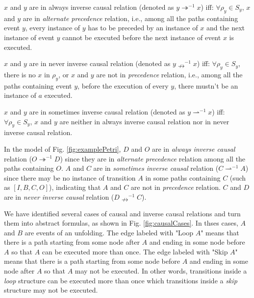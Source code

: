 \documentclass{llncs}
\begin{document}
\begin{definition}\label{def:alwaysInverseCausal}
$x$ and $y$ are in always inverse causal relation (denoted as $y\twoheadrightarrow^{-1}x$) iff: $\forall\rho_{y}\in S_{y}$, $x$ and $y$ are in \textit{alternate precedence} relation, i.e., among all the paths containing event $y$, every instance of $y$ has to be preceded by an instance of $x$ and the next instance of event $y$ cannot be executed before the next instance of event $x$ is executed.
\end{definition}

\begin{definition}\label{def:neverInverseCausal}
$x$ and $y$ are in never inverse causal relation (denoted as $y\nrightarrow^{-1}x$) iff: $\forall\rho_{y}\in S_{y}$, there is no $x$ in $\rho_{y}$, or $x$ and $y$ are not in \textit{precedence} relation, i.e., among all the paths containing event $y$, before the execution of every $y$, there mustn't be an instance of $a$ executed.
\end{definition}

\begin{definition}\label{def:sometimesInverseCausal}
$x$ and $y$ are in sometimes inverse causal relation (denoted as $y\rightharpoonup^{-1}x$) iff: $\forall\rho_{y}\in S_{y}$, $x$ and $y$ are neither in always inverse causal relation nor in never inverse causal relation.
\end{definition}

\begin{example}
In the model of Fig. \ref{fig:examplePetri}, $D$ and $O$ are in \textit{always inverse causal} relation ($O\twoheadrightarrow^{-1}D$) since they are in \textit{alternate precedence} relation among all the paths containing $O$. $A$ and $C$ are in \textit{sometimes inverse causal} relation ($C\rightharpoonup^{-1}A$) since there may be no instance of transition $A$ in some paths containing $C$ (such as $[I,B,C,O]$), indicating that $A$ and $C$ are not in \textit{precedence} relation. $C$ and $D$ are in \textit{never inverse causal} relation ($D\nrightarrow^{-1}C$).
\end{example}

We have identified several cases of causal and inverse causal relations and turn them into abstract formulas, as shown in Fig. \ref{fig:causalCases}. In thses cases, $A$ and $B$ are events of an unfolding. The edge labeled with "Loop $A$" means that there is a path starting from some node after $A$ and ending in some node before $A$ so that $A$ can be executed more than once. The edge labeled with "Skip $A$" means that there is a path starting from some node before $A$ and ending in some node after $A$ so that $A$ may not be executed. In other words, transitions inside a \textit{loop} structure can be executed more than once which transitions inside a \textit{skip} structure may not be executed.
\end{document}
